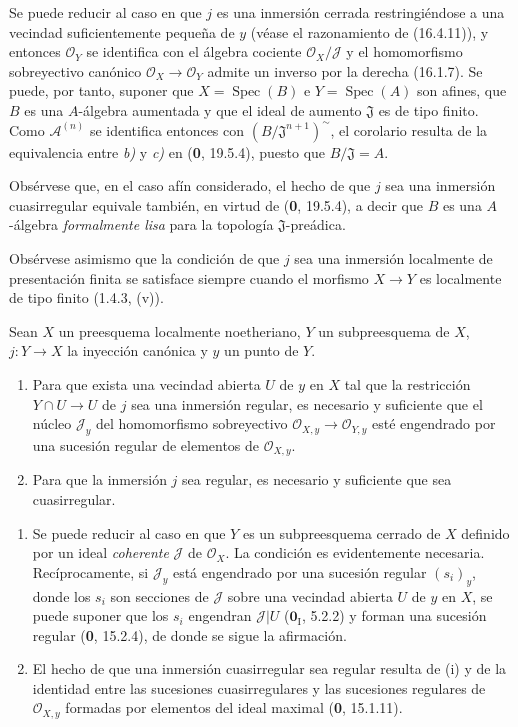 Se puede reducir al caso en que $j$ es una inmersión cerrada restringiéndose
a una vecindad suficientemente pequeña de $y$ (véase el razonamiento de
(16.4.11)), y entonces $\mathcal{O}_Y$ se identifica con el álgebra cociente
$\mathcal{O}_X/\mathscr J$ y el homomorfismo sobreyectivo canónico
$\mathcal{O}_X\to\mathcal{O}_Y$ admite un
inverso por la derecha (16.1.7). Se puede, por tanto, suponer que
$X=\operatorname{Spec}(B)$ e $Y=\operatorname{Spec}(A)$ son afines, que $B$
es una $A$-álgebra aumentada y que el ideal de aumento $\mathfrak J$ es de
tipo finito. Como $\mathscr{A}^{(n)}$ se identifica entonces con
$(B/\mathfrak J^{n+1})^{\sim}$, el corolario resulta de la equivalencia entre
\emph{b)} y \emph{c)} en (\textbf 0, 19.5.4), puesto que $B/\mathfrak J=A$.

Obsérvese que, en el caso afín considerado, el hecho de que $j$ sea una
inmersión cuasirregular equivale también, en virtud de (\textbf 0, 19.5.4), a decir
que $B$ es una $A$-álgebra \emph{formalmente lisa} para la topología
$\mathfrak J$-preádica.

Obsérvese asimismo que la condición de que $j$ sea una inmersión localmente de
presentación finita se satisface siempre cuando el morfismo $X\to Y$ es
localmente de tipo finito (1.4.3, (v)).

\begin{proposition}[16.9.10]
\label{IV.16.9.10}
Sean $X$ un preesquema localmente noetheriano, $Y$ un subpreesquema de $X$,
$j:Y\to X$ la inyección canónica y $y$ un punto de $Y$.
\begin{enumerate}
  \item[\textup{(i)}] Para que exista una vecindad abierta $U$ de $y$ en $X$ tal que
  la restricción $Y\cap U\to U$ de $j$ sea una inmersión regular, es necesario
  y suficiente que el núcleo $\mathscr J_y$ del homomorfismo sobreyectivo
  $\mathcal{O}_{X,y}\to\mathcal{O}_{Y,y}$ esté engendrado por una sucesión
  regular de elementos de $\mathcal{O}_{X,y}$.
  \item[\textup{(ii)}] Para que la inmersión $j$ sea regular, es necesario y suficiente
  que sea cuasirregular.
\end{enumerate}
\end{proposition}

\begin{enumerate}
  \item[(i)] Se puede reducir al caso en que $Y$ es un subpreesquema cerrado
  de $X$ definido por un ideal \emph{coherente} $\mathscr J$ de
  $\mathcal{O}_X$. La condición es evidentemente necesaria. Recíprocamente,
  si $\mathscr J_y$ está engendrado por una sucesión regular $(s_i)_y$, donde
  los $s_i$ son secciones de $\mathscr J$ sobre una vecindad abierta $U$ de
  $y$ en $X$, se puede suponer que los $s_i$ engendran $\mathscr J|U$
  ($\mathbf{0}_{\mathrm I}$, 5.2.2) y forman una sucesión regular (\textbf 0, 15.2.4), de
  donde se sigue la afirmación.
  \item[(ii)] El hecho de que una inmersión cuasirregular sea regular resulta
  de (i) y de la identidad entre las sucesiones cuasirregulares y las
  sucesiones regulares de $\mathcal{O}_{X,y}$ formadas por elementos del ideal
  maximal (\textbf 0, 15.1.11).
\end{enumerate}

